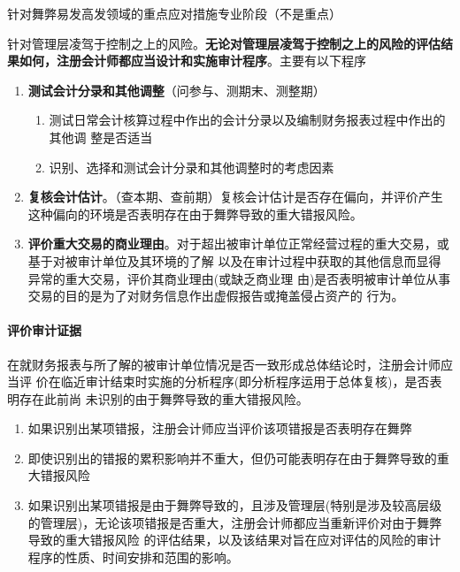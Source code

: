 \documentclass[UTF8,12pt]{ctexart}
\numberwithin{equation}{section} %
\numberwithin{figure}{section}
\numberwithin{table}{section}
\begin{document}
	针对舞弊易发高发领域的重点应对措施专业阶段（不是重点）
	
	针对管理层凌驾于控制之上的风险。\textbf{无论对管理层凌驾于控制之上的风险的评估结果如何，注册会计师都应当设计和实施审计程序}。主要有以下程序
	\begin{enumerate}
		\item \textbf{测试会计分录和其他调整}（问参与、测期末、测整期）
		\begin{enumerate}
			\item 测试日常会计核算过程中作出的会计分录以及编制财务报表过程中作出的其他调 整是否适当
			
			\item 识别、选择和测试会计分录和其他调整时的考虑因素
		\end{enumerate}
		
		\item \textbf{复核会计估计}。（查本期、查前期）复核会计估计是否存在偏向，并评价产生这种偏向的环境是否表明存在由于舞弊导致的重大错报风险。
		
		\item \textbf{评价重大交易的商业理由}。对于超出被审计单位正常经营过程的重大交易，或基于对被审计单位及其环境的了解
		以及在审计过程中获取的其他信息而显得异常的重大交易，评价其商业理由(或缺乏商业理 由)是否表明被审计单位从事交易的目的是为了对财务信息作出虚假报告或掩盖侵占资产的 行为。
	\end{enumerate}
	
	\paragraph{评价审计证据}
	在就财务报表与所了解的被审计单位情况是否一致形成总体结论时，注册会计师应当评 价在临近审计结束时实施的分析程序(即分析程序运用于总体复核)，是否表明存在此前尚 未识别的由于舞弊导致的重大错报风险。
	
	\begin{enumerate}
		\item 如果识别出某项错报，注册会计师应当评价该项错报是否表明存在舞弊
		
		\item 即使识别出的错报的累积影响并不重大，但仍可能表明存在由于舞弊导致的重大错报风险
		
		\item 如果识别出某项错报是由于舞弊导致的，且涉及管理层(特别是涉及较高层级的管理层)，无论该项错报是否重大，注册会计师都应当重新评价对由于舞弊导致的重大错报风险 的评估结果，以及该结果对旨在应对评估的风险的审计程序的性质、时间安排和范围的影响。
	\end{enumerate}
	
\end{document}
